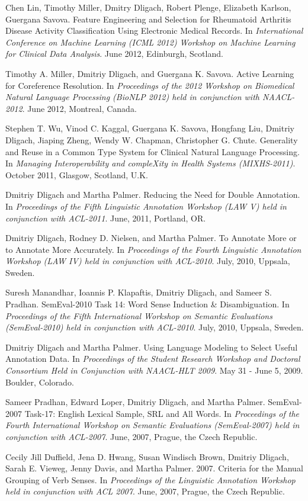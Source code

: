 \documentclass[letterpaper]{article}
\renewenvironment{itemize}{
  \begin{list}{}{
    \setlength{\leftmargin}{1.5em}
  }
}{
  \end{list}
}
\begin{document}
\begin{itemize}
\item Chen Lin, Timothy Miller, Dmitry Dligach, Robert Plenge, Elizabeth Karlson, Guergana Savova. Feature Engineering and Selection for Rheumatoid Arthritis Disease Activity Classification Using Electronic Medical Records. In \emph{International Conference on Machine Learning (ICML 2012) Workshop on Machine Learning for Clinical Data Analysis}. June 2012, Edinburgh, Scotland.
\item Timothy A. Miller, Dmitriy Dligach, and Guergana K. Savova. Active Learning for Coreference Resolution. In \emph{Proceedings of the 2012 Workshop on Biomedical Natural Language Processing (BioNLP 2012) held in conjunction with NAACL-2012}. June 2012, Montreal, Canada.
\item Stephen T. Wu, Vinod C. Kaggal, Guergana K. Savova, Hongfang Liu, Dmitriy Dligach, Jiaping Zheng, Wendy W. Chapman, Christopher G. Chute. Generality and Reuse in a Common Type System for Clinical Natural Language Processing. In \emph{Managing Interoperability and compleXity in Health Systems (MIXHS-2011)}. October 2011, Glasgow, Scotland, U.K.
\item Dmitriy Dligach and Martha Palmer. Reducing the Need for Double Annotation. In \emph{Proceedings of the Fifth Linguistic Annotation Workshop (LAW V) held in conjunction with ACL-2011}. June, 2011, Portland, OR.
\item Dmitriy Dligach, Rodney D. Nielsen, and Martha Palmer. To Annotate More or to Annotate More Accurately. In \emph{Proceedings of the Fourth Linguistic Annotation Workshop (LAW IV) held in conjunction with ACL-2010}. July, 2010, Uppsala, Sweden.
\item Suresh Manandhar, Ioannis P. Klapaftis, Dmitriy Dligach, and Sameer S. Pradhan. SemEval-2010 Task 14: Word Sense Induction \& Disambiguation. In \emph{Proceedings of the Fifth International Workshop on Semantic Evaluations (SemEval-2010) held in conjunction with ACL-2010}. July, 2010, Uppsala, Sweden.
\item Dmitriy Dligach and Martha Palmer. Using Language Modeling to Select Useful Annotation Data. In \emph {Proceedings of the Student Research Workshop and Doctoral Consortium Held in Conjunction with NAACL-HLT 2009}. May 31 - June 5, 2009. Boulder, Colorado.
\item Sameer Pradhan, Edward Loper, Dmitriy Dligach, and Martha Palmer. SemEval-2007 Task-17: English Lexical Sample, SRL and All Words. In \emph {Proceedings of the Fourth International Workshop on Semantic Evaluations (SemEval-2007) held in conjunction with ACL-2007}. June, 2007, Prague, the Czech Republic.
\item Cecily Jill Duffield, Jena D. Hwang, Susan Windisch Brown, Dmitriy Dligach, Sarah E. Vieweg, Jenny Davis, and Martha Palmer. 2007. Criteria for the Manual Grouping of Verb Senses. In \emph {Proceedings of the Linguistic Annotation Workshop held in conjunction with ACL 2007}. June, 2007, Prague, the Czech Republic.
\end{itemize}
\end{document}
